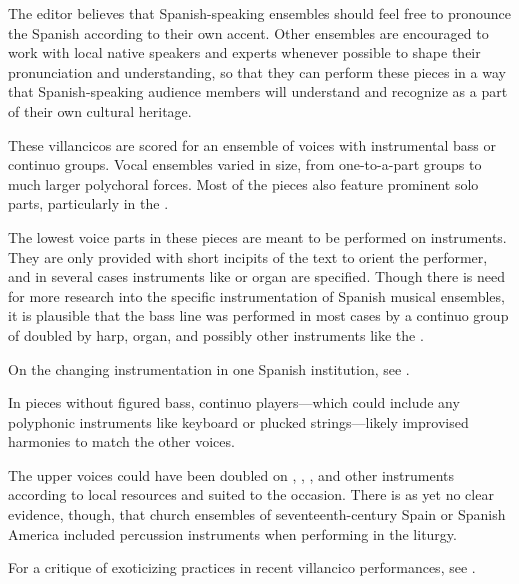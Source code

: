 
The editor believes that Spanish-speaking ensembles should feel free to
pronounce the Spanish according to their own accent.
Other ensembles are encouraged to work with local native speakers and experts
whenever possible to shape their pronunciation and understanding, so that they
can perform these pieces in a way that Spanish-speaking audience members will
understand and recognize as a part of their own cultural heritage.

These villancicos are scored for an ensemble of voices with instrumental bass 
or continuo groups.
Vocal ensembles varied in size, from one-to-a-part groups to much larger 
polychoral forces.
Most of the pieces also feature prominent solo parts, particularly in the 
.

The lowest voice parts in these pieces are meant to be performed on instruments. 
They are only provided with short incipits of the text to orient the 
performer, and in several cases instruments like  or organ are specified.
Though there is need for more research into the specific instrumentation of 
Spanish musical ensembles, it is plausible that the bass line was performed in 
most cases by a continuo group of  doubled by harp, organ, and 
possibly other instruments like the .%
\begin{Footnote}
    On the changing instrumentation in one Spanish institution, see 
    \autocite{Torrente:PhD}.
\end{Footnote}
In pieces without figured bass, continuo players---which could include any
polyphonic instruments like keyboard or plucked strings---likely improvised
harmonies to match the other voices.

The upper voices could have been doubled on ,
, , and other instruments
according to local resources and suited to the occasion.
There is as yet no clear evidence, though, that church ensembles of 
seventeenth-century Spain or Spanish America included percussion instruments
when performing in the liturgy.%
\begin{Footnote}
    For a critique of exoticizing practices in recent villancico performances,  
    see \autocites{Baker:PerformancePostColonial}{Davies:LocalContent}.
\end{Footnote}

